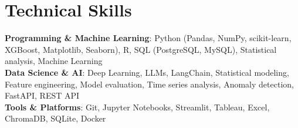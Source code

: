 \documentclass[letterpaper,11pt]{article}
\begin{document}
\section{Technical Skills}
 \begin{itemize}[leftmargin=0.15in, label={}]
    \small{\item{
     \textbf{Programming \& Machine Learning}{: Python (Pandas, NumPy, scikit-learn, XGBoost, Matplotlib, Seaborn), R, SQL (PostgreSQL, MySQL), Statistical analysis, Machine Learning} \\
     \textbf{Data Science \& AI}{: Deep Learning, LLMs, LangChain, Statistical modeling, Feature engineering, Model evaluation, Time series analysis, Anomaly detection, FastAPI, REST API} \\
     \textbf{Tools \& Platforms}{: Git, Jupyter Notebooks, Streamlit, Tableau, Excel, ChromaDB, SQLite, Docker} \\
    }}
 \end{itemize}

\end{document}
